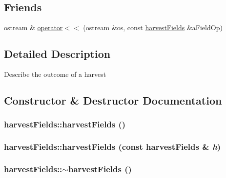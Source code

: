 \subsection*{Friends}
\begin{DoxyCompactItemize}
\item 
ostream \& \hyperlink{classharvest_fields_a0aea28a5f5ab32df57a2204cce6cd04b}{operator$<$$<$} (ostream \&os, const \hyperlink{classharvest_fields}{harvestFields} \&aFieldOp)
\end{DoxyCompactItemize}


\subsection{Detailed Description}
Describe the outcome of a harvest 

\subsection{Constructor \& Destructor Documentation}
\hypertarget{classharvest_fields_a8b8fcdfd3c788f786028f5e0debd18cd}{
\subsubsection[{harvestFields}]{\setlength{\rightskip}{0pt plus 5cm}harvestFields::harvestFields ()}}
\label{classharvest_fields_a8b8fcdfd3c788f786028f5e0debd18cd}
\hypertarget{classharvest_fields_a96f508aeaf0387012d820861a2c8add7}{
\subsubsection[{harvestFields}]{\setlength{\rightskip}{0pt plus 5cm}harvestFields::harvestFields (const {\bf harvestFields} \& {\em h})}}
\label{classharvest_fields_a96f508aeaf0387012d820861a2c8add7}
\hypertarget{classharvest_fields_a55a3857a71addd3d362c0c9f85e6a920}{
\subsubsection[{$\sim$harvestFields}]{\setlength{\rightskip}{0pt plus 5cm}harvestFields::$\sim$harvestFields ()}}
\label{classharvest_fields_a55a3857a71addd3d362c0c9f85e6a920}


